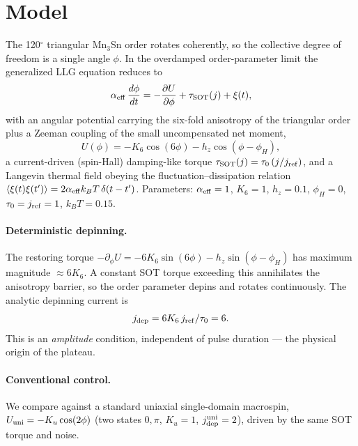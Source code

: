 \documentclass[11pt]{article}
\begin{document}
\section{Model}
The 120$^\circ$ triangular Mn$_3$Sn order rotates coherently, so the collective
degree of freedom is a single angle $\phi$. In the overdamped
order-parameter limit the generalized LLG equation reduces to
\begin{equation}
  \alpha_{\rm eff}\,\frac{d\phi}{dt}
  = -\frac{\partial U}{\partial \phi} + \tau_{\rm SOT}(j) + \xi(t),
  \label{eq:eom}
\end{equation}
with an angular potential carrying the six-fold anisotropy of the triangular
order plus a Zeeman coupling of the small uncompensated net moment,
\begin{equation}
  U(\phi) = -K_6\cos(6\phi) - h_z\cos(\phi-\phi_H),
\end{equation}
a current-driven (spin-Hall) damping-like torque
$\tau_{\rm SOT}(j)=\tau_0\,(j/j_{\rm ref})$, and a Langevin thermal field
obeying the fluctuation--dissipation relation
$\langle \xi(t)\xi(t')\rangle = 2\alpha_{\rm eff}k_BT\,\delta(t-t')$.
Parameters: $\alpha_{\rm eff}=1$, $K_6=1$, $h_z=0.1$, $\phi_H=0$,
$\tau_0=j_{\rm ref}=1$, $k_BT=0.15$.

\paragraph{Deterministic depinning.} The restoring torque
$-\partial_\phi U = -6K_6\sin(6\phi)-h_z\sin(\phi-\phi_H)$ has maximum
magnitude $\approx 6K_6$. A constant SOT torque exceeding this annihilates the
anisotropy barrier, so the order parameter depins and rotates continuously.
The analytic depinning current is
\begin{equation}
  j_{\rm dep} = 6K_6\, j_{\rm ref}/\tau_0 = 6.
\end{equation}
This is an \emph{amplitude} condition, independent of pulse duration --- the
physical origin of the plateau.

\paragraph{Conventional control.} We compare against a standard uniaxial
single-domain macrospin, $U_{\rm uni}=-K_u\cos(2\phi)$ (two states $0,\pi$,
$K_u=1$, $j_{\rm dep}^{\rm uni}=2$), driven by the same SOT torque and noise.
\end{document}
